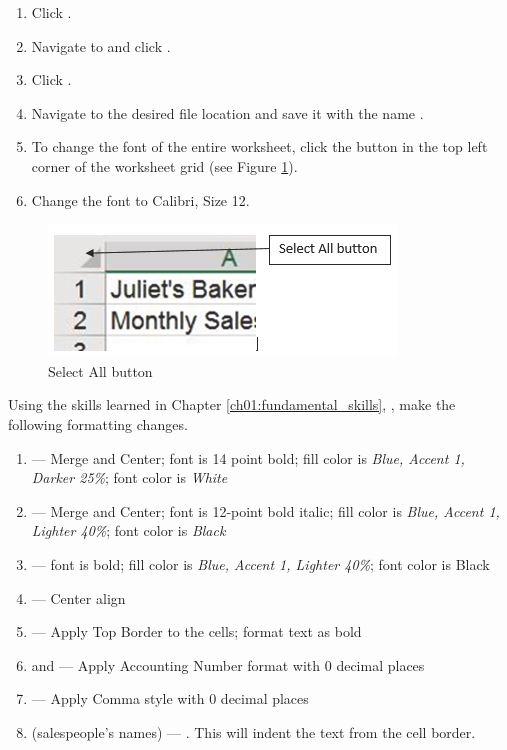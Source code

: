 \begin{enumerate}
	\item Click .
	\item Navigate to  and click .
	\item Click .
	\item Navigate to the desired file location and save it with the name .
	\item To change the font of the entire worksheet, click the  button in the top left corner of the worksheet grid (see Figure \ref{02:fig41}).
	\item Change the font to Calibri, Size 12.
\end{enumerate}

\begin{figure}[H]
	\centering
	\includegraphics[width=\maxwidth{.95\linewidth}]{gfx/ch02_fig41}
	\caption{Select All button}
	\label{02:fig41}
\end{figure}

Using the skills learned in Chapter \ref{ch01:fundamental_skills}, , make the following formatting changes.

\begin{enumerate}
	\item {} --- Merge and Center; font is 14 point bold; fill color is \textit{Blue, Accent 1, Darker 25\%}; font color is \textit{White}
	\item {} --- Merge and Center; font is 12-point bold italic; fill color is \textit{Blue, Accent 1, Lighter 40\%}; font color is \textit{Black}
	\item {} --- font is bold; fill color is \textit{Blue, Accent 1, Lighter 40\%}; font color is Black
	\item {} --- Center align
	\item {} --- Apply Top Border to the cells; format text as bold
	\item {} and  --- Apply Accounting Number format with $ 0 $ decimal places
	\item {} --- Apply Comma style with $ 0 $ decimal places
	\item {} (salespeople's names) --- . This will indent the text from the cell border.
\end{enumerate}

